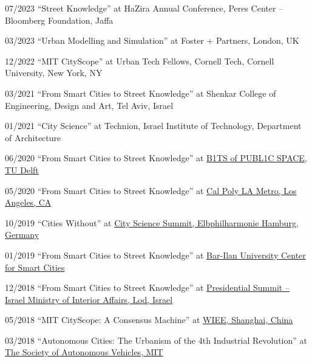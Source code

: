 \begin{tablist}
    \item[07/2023] \tab \enquote{Street Knowledge} at
    {HaZira Annual Conference, Peres Center -- Bloomberg Foundation, Jaffa}

    \item[03/2023] \tab \enquote{Urban Modelling and Simulation} at
    {Foster + Partners, London, UK}

    \item[12/2022] \tab \enquote{MIT CityScope} at
    {Urban Tech Fellows, Cornell Tech, Cornell University, New York, NY}

    \item[03/2021] \tab \enquote{From Smart Cities to Street Knowledge} at
    {Shenkar College of Engineering, Design and Art, Tel Aviv, Israel}

    \item[01/2021] \tab \enquote{City Science} at
    {Technion, Israel Institute of Technology, Department of Architecture}

    \item[06/2020] \tab \enquote{From Smart Cities to Street Knowledge} at
    \href{http://www.polistudelft.nl/urbanism-week/b1ts-of-publ1c-space-3-0/}{B1TS of PUBL1C SPACE, TU Delft}

    \item[05/2020] \tab \enquote{From Smart Cities to Street Knowledge} at
    \href{https://www.youtube.com/watch?v=Rh5ks9x3720}{Cal Poly LA Metro, Los Angeles, CA}

    \item[10/2019] \tab \enquote{Cities Without} at
    \href{https://www.youtube.com/watch?v=PZg6A_A65lQ}{City Science Summit, Elbphilharmonie Hamburg, Germany}

    \item[01/2019] \tab \enquote{From Smart Cities to Street Knowledge} at
    \href{https://law.biu.ac.il/sites/law/files/shared/mrym_khkmvt_lkhkmt_hrkhvb.pdf}{Bar-Ilan University Center for Smart Cities}

    \item[12/2018] \tab \enquote{From Smart Cities to Street Knowledge} at
    \href{https://www.youtube.com/watch?v=skIEkM9-1yg}{Presidential Summit -- Israel Ministry of Interior Affairs, Lod, Israel}

    \item[05/2018] \tab \enquote{MIT CityScope: A Consensus Machine} at
    \href{https://wiee.tongji.edu.cn/CSS2018/}{WIEE, Shanghai, China}

    \item[03/2018] \tab \enquote{Autonomous Cities: The Urbanism of the 4th Industrial Revolution} at
    \href{http://cameraculture.media.mit.edu/category/blog/}{The Society of Autonomous Vehicles, MIT}


\end{tablist}
